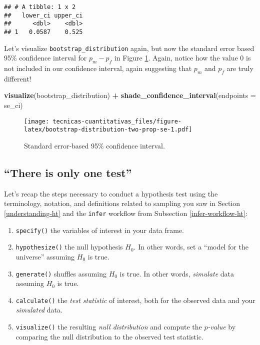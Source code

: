 \documentclass[
]{book}
\newenvironment{Shaded}{\begin{snugshade}}{\end{snugshade}}
\newcommand{\DataTypeTok}[1]{\textcolor[rgb]{0.13,0.29,0.53}{#1}}
\newcommand{\KeywordTok}[1]{\textcolor[rgb]{0.13,0.29,0.53}{\textbf{#1}}}
\newcommand{\NormalTok}[1]{#1}
\newcommand{\OperatorTok}[1]{\textcolor[rgb]{0.81,0.36,0.00}{\textbf{#1}}}
\newcommand{\StringTok}[1]{\textcolor[rgb]{0.31,0.60,0.02}{#1}}
\providecommand{\tightlist}{%
  \setlength{\itemsep}{0pt}\setlength{\parskip}{0pt}}
\begin{document}
\begin{verbatim}
## # A tibble: 1 x 2
##   lower_ci upper_ci
##      <dbl>    <dbl>
## 1   0.0587    0.525
\end{verbatim}

Let's visualize \texttt{bootstrap\_distribution} again, but now the standard error based 95\% confidence interval for \(p_{m} - p_{f}\) in Figure \ref{fig:bootstrap-distribution-two-prop-se}. Again, notice how the value 0 is not included in our confidence interval, again suggesting that \(p_{m}\) and \(p_{f}\) are truly different!

\begin{Shaded}
\begin{Highlighting}[]
\KeywordTok{visualize}\NormalTok{(bootstrap_distribution) }\OperatorTok{+}\StringTok{ }
\StringTok{  }\KeywordTok{shade_confidence_interval}\NormalTok{(}\DataTypeTok{endpoints =}\NormalTok{ se_ci)}
\end{Highlighting}
\end{Shaded}

\begin{figure}
\centering
\texttt{[image: tecnicas-cuantitativas\_files/figure-latex/bootstrap-distribution-two-prop-se-1.pdf]}
\caption{\label{fig:bootstrap-distribution-two-prop-se}Standard error-based 95\% confidence interval.}
\end{figure}

\hypertarget{only-one-test}{%
\subsection{``There is only one test''}\label{only-one-test}}

Let's recap the steps necessary to conduct a hypothesis test using the terminology, notation, and definitions related to sampling you saw in Section \ref{understanding-ht} and the \texttt{infer} workflow from Subsection \ref{infer-workflow-ht}:

\begin{enumerate}
\def\labelenumi{\arabic{enumi}.}
\tightlist
\item
  \texttt{specify()} the variables of interest in your data frame.
\item
  \texttt{hypothesize()} the null hypothesis \(H_0\). In other words, set a ``model for the universe'' assuming \(H_0\) is true.
\item
  \texttt{generate()} shuffles assuming \(H_0\) is true. In other words, \emph{simulate} data assuming \(H_0\) is true.
\item
  \texttt{calculate()} the \emph{test statistic} of interest, both for the observed data and your \emph{simulated} data.
\item
  \texttt{visualize()} the resulting \emph{null distribution} and compute the \emph{\(p\)-value} by comparing the null distribution to the observed test statistic.
\end{enumerate}
\end{document}
